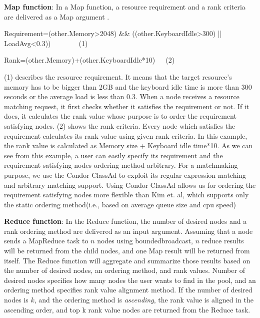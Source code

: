 \documentclass{acm_proc_article-sp}
\begin{document}
\textbf{Map function}: In a Map function, a resource requirement and a rank criteria are delivered as a Map argument .
\begin{flushleft}Requirement=(other.Memory>2048) \&\& ((other.KeyboardIdle>300) || LoadAvg<0.3))\ \ \ \ \ \ \ \ (1)\end{flushleft}
\begin{flushleft}Rank=(other.Memory)+(other.KeyboardIdle*10)\ \ \ (2)\end{flushleft}
(1) describes the resource requirement. It means that the target resource's memory has to be bigger than 2GB and the keyboard idle time is more than 300 seconds or the average load is less than 0.3.
When a node receives a resource matching request, it first checks whether it satisfies the requirement or not. If it does, it calculates the rank value whose purpose is to order the requirement satisfying nodes.
(2) shows the rank criteria. Every node which satisfies the requirement calculates its rank value using given rank criteria. In this example, the rank value is calculated as Memory size + Keyboard idle time*10.
As we can see from this example, a user can easily specify its requirement and the requirement satisfying nodes ordering method arbitrary.
For a matchmaking purpose, we use the Condor ClassAd\cite{classad} to exploit its regular expression matching and arbitrary matching support.
Using Condor ClassAd allows us for ordering the requirement satisfying nodes more flexible than Kim et. al\cite{can_query}, which supports only the static ordering method(i.e., based on average queue size and cpu speed)

\textbf{Reduce function}: In the Reduce function, the number of desired nodes and a rank ordering method are delivered as an input argument.
Assuming that a node sends a MapReduce task to $n$ nodes using boundedbroadcast, \begin{math}n\end{math} reduce results will be returned from the child nodes, 
and one Map result will be returned from itself. The Reduce function will aggregate and summarize those results based on the number of desired nodes, an ordering method, and rank values. 
Number of desired nodes specifies how many nodes the user wants to find in the pool, and an ordering method specifies rank value alignment method. 
If the number of desired nodes is $k$, and the ordering method is \textit{ascending}, the rank value is aligned in the ascending order, and top k rank value nodes are returned from the Reduce task.
\end{document}
